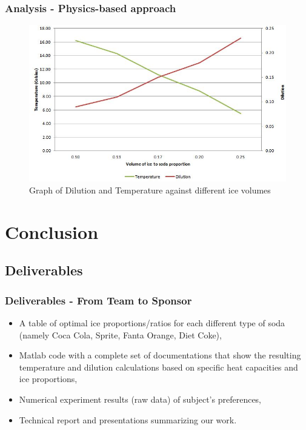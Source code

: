 \documentclass[compress,handout,10pt]{beamer}
\let\olditem\item
\renewcommand{\item}{\setlength{\itemsep}{0.5\baselineskip}\olditem}
\begin{document}
\begin{frame}
    \frametitle{Analysis - Physics-based approach}

\begin{figure}
	\centering
	\caption{Graph of Dilution and Temperature against different ice volumes}
	\includegraphics[width=\textwidth]{Extra/Graph.jpg}
\end{figure}

\end{frame}



\section{Conclusion}
\subsection{Deliverables}
\begin{frame}
    \frametitle{Deliverables - From Team to Sponsor}


\begin{itemize}
    \item A table of optimal ice proportions/ratios for each different type of soda (namely Coca Cola, Sprite, Fanta Orange, Diet Coke),
    \item Matlab code with a complete set of documentations that show the resulting temperature and dilution calculations based on specific heat capacities and ice proportions,
    \item Numerical experiment results (raw data) of subject's preferences,
    \item Technical report and presentations summarizing our work. 
\end{itemize}


\end{frame}
\end{document}
